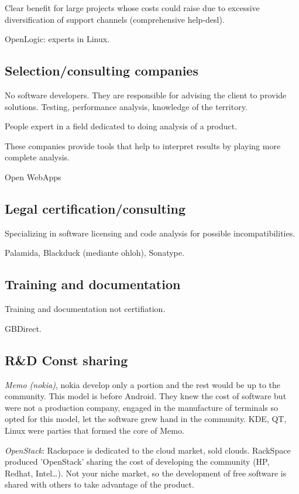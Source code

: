 Clear benefit for large projects whose costs could raise due to excessive
 diversification of support channels (comprehensive help-desl).

OpenLogic: experts in Linux.

\subsection{Selection/consulting companies}

No software developers. They are responsible for advising the client to 
provide solutions. Testing, performance analysis, knowledge of the territory.

People expert in a field dedicated to doing analysis of a product.

These companies provide tools that help to interpret results by playing 
more complete analysis.

Open WebApps

\subsection{Legal certification/consulting}

Specializing in software licensing and code analysis for possible 
incompatibilities.

Palamida, Blackduck (mediante ohloh), Sonatype.

\subsection{Training and documentation}

Training and documentation not certifiation.

GBDirect. 

\subsection{R\&D Const sharing}

\emph{Memo (nokia)}, nokia develop only a portion and the rest would be up to the
 community. This model is before Android. They knew the cost of software but 
 were not a production company, engaged in the manufacture of terminals so 
 opted for this model, let the software grew hand in the community. KDE, QT, 
 Linux were parties that formed the core of Memo.
 
\emph{OpenStack}: Rackspace is dedicated to the cloud market, sold clouds. 
RackSpace produced 'OpenStack' sharing the cost of developing the community 
(HP, Redhat, Intel\ldots). Not your niche market, so the development of free
 software is shared with others to take advantage of the product.
 

